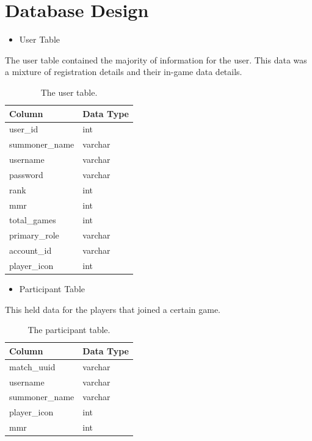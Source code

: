 \newpage
\section{Database Design}

\begin{itemize}
	\item User Table
\end{itemize}
The user table contained the majority of information for the user. This data was a mixture of registration details and their in-game data details.
\begin{table}[h]
	\centering
	\begin{tabular}{ll}
		\toprule
		Column         & Data Type \\
		\midrule
		user\_id       & int       \\
		summoner\_name & varchar   \\
		username       & varchar   \\
		password       & varchar   \\
		rank           & int       \\
		mmr            & int       \\
		total\_games   & int       \\
		primary\_role  & varchar   \\
		account\_id    & varchar   \\
		player\_icon   & int   \\ 
		\bottomrule  
	\end{tabular}
\caption{The user table.}
\end{table}

\begin{itemize}
	\item Participant Table
\end{itemize}
This held data for the players that joined a certain game.
\begin{table}[h]
	\centering
	\begin{tabular}{ll}
		\toprule
		Column         & Data Type \\
		\midrule
		match\_uuid    & varchar   \\
		username       & varchar   \\
		summoner\_name & varchar   \\
		player\_icon   & int       \\
		mmr            & int   \\
		\bottomrule    
	\end{tabular}
\caption{The participant table.}
\end{table}

